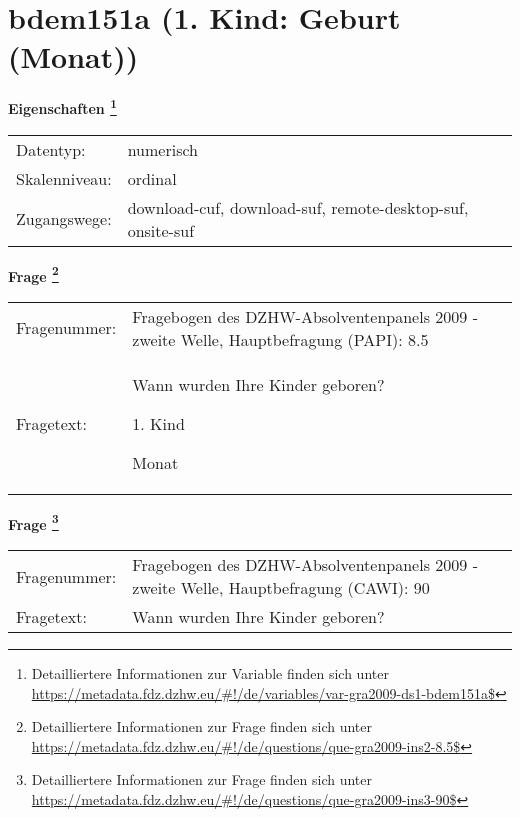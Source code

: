 
    \setcounter{footnote}{0}

    \vspace*{-1.8cm}
	\section{bdem151a (1. Kind: Geburt (Monat))}
	\label{section:bdem151a}



    \vspace*{0.5cm}
    \noindent\textbf{Eigenschaften
	\footnote{Detailliertere Informationen zur Variable finden sich unter
		\url{https://metadata.fdz.dzhw.eu/\#!/de/variables/var-gra2009-ds1-bdem151a$}}}\\
	\begin{tabularx}{\hsize}{@{}lX}
	Datentyp: & numerisch \\
	Skalenniveau: & ordinal \\
	Zugangswege: &
	  download-cuf, 
	  download-suf, 
	  remote-desktop-suf, 
	  onsite-suf
 \\
    \end{tabularx}



				\vspace*{0.5cm}
                \noindent\textbf{Frage
	                \footnote{Detailliertere Informationen zur Frage finden sich unter
		              \url{https://metadata.fdz.dzhw.eu/\#!/de/questions/que-gra2009-ins2-8.5$}}}\\
				\begin{tabularx}{\hsize}{@{}lX}
					Fragenummer: &
					  Fragebogen des DZHW-Absolventenpanels 2009 - zweite Welle, Hauptbefragung (PAPI):
					  8.5
 \\
					Fragetext: & Wann wurden Ihre Kinder geboren?\par  1. Kind\par  Monat \\
				\end{tabularx}
				\vspace*{0.5cm}
                \noindent\textbf{Frage
	                \footnote{Detailliertere Informationen zur Frage finden sich unter
		              \url{https://metadata.fdz.dzhw.eu/\#!/de/questions/que-gra2009-ins3-90$}}}\\
				\begin{tabularx}{\hsize}{@{}lX}
					Fragenummer: &
					  Fragebogen des DZHW-Absolventenpanels 2009 - zweite Welle, Hauptbefragung (CAWI):
					  90
 \\
					Fragetext: & Wann wurden Ihre Kinder geboren? \\
				\end{tabularx}





